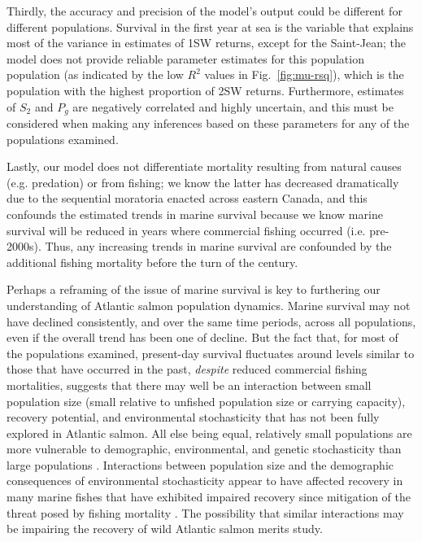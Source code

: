 \documentclass[12pt]{article}
\newcommand{\St}{$S_{2}$\xspace}
\newcommand{\Pg}{$P_g$\xspace}
\begin{document}
Thirdly, the accuracy and precision of the model's output could be different
for different populations. Survival in the first year at sea is the variable
that explains most of the variance in estimates of 1SW returns, except for the
Saint-Jean; 
the model does not provide reliable parameter estimates for this population
population (as indicated by the low $R^2$ values in Fig.~\ref{fig:mu-rsq}),
which is the population with the highest proportion of 2SW returns.
Furthermore, estimates of \St and \Pg are negatively correlated and highly
uncertain, and this must be considered when making any inferences based on
these parameters for any of the populations examined.

Lastly, our model does not differentiate mortality resulting from natural
causes (e.g. predation) or from fishing; we know the latter has decreased
dramatically due to the sequential moratoria enacted across eastern Canada, and this
confounds the estimated trends in marine survival because we know marine survival
will be reduced in years where commercial fishing occurred (i.e. pre-2000s).
Thus, any increasing trends in marine survival are confounded by the additional 
fishing mortality before the turn of the century.

Perhaps a reframing of the issue of marine survival is key to furthering our
understanding of Atlantic salmon population dynamics. Marine survival may not
have declined consistently, and over the same time periods, across all
populations, even if the overall trend has been one of decline. 
But the fact that, for most of the populations examined, 
present-day survival fluctuates around levels similar to those that have occurred in the past, 
\emph{despite} reduced commercial fishing mortalities, suggests
that there may well be an interaction between small population size (small
relative to unfished population size or carrying capacity), recovery
potential, and environmental stochasticity that has not been fully explored in
Atlantic salmon. 
All else being equal, relatively small populations are more vulnerable to
demographic, environmental, and genetic stochasticity than large populations
\citep{Lande1993, Hutchings2015}. Interactions between population size and the
demographic consequences of environmental stochasticity appear to have
affected recovery in many marine fishes that have exhibited impaired recovery
since mitigation of the threat posed by fishing mortality
\citep{Hutchings2017, Hutchings2020}. The possibility that similar
interactions may be impairing the recovery of wild Atlantic salmon merits
study.
\end{document}
